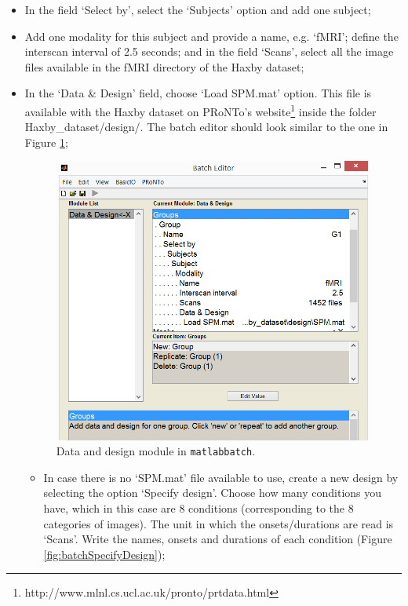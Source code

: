 \begin{itemize}
\begin{itemize}
		\item In the field `Select by', select the `Subjects' option and add one subject;
		
		\item Add one modality for this subject and provide a name, e.g. `fMRI'; define the interscan interval of 2.5 seconds; and in the field `Scans', select all the image files available in the fMRI directory of the Haxby dataset;	
		
		\item In the `Data \& Design' field, choose `Load SPM.mat' option. This file is available with the Haxby dataset on PRoNTo's website\footnote{http://www.mlnl.cs.ucl.ac.uk/pronto/prtdata.html} inside the folder Haxby\_dataset/design/. The batch editor should look similar to the one in Figure \ref{fig:batchGroups};	
		
		\begin{figure}[h!]
	\centering
		\includegraphics[scale=0.6]{images/Tutorial/classification/batchGroups.png}
	\caption{Data and design module in {\tt matlabbatch}. }
	\label{fig:batchGroups}
	\end{figure}
				
		
		\begin{itemize}
	
			\item In case there is no `SPM.mat' file available to use, create a new	design by selecting the option `Specify design'. Choose how many conditions you have, which in this case are 8 conditions (corresponding to the 8 categories of images). The unit in which the onsets/durations are read is `Scans'. Write the names, onsets and durations of each condition (Figure \ref{fig:batchSpecifyDesign});
	

\end{itemize}
\end{itemize}
\end{itemize}

